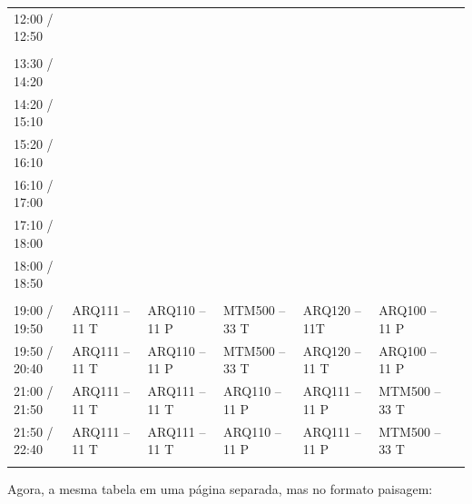 \documentclass[
	12pt,				%
	openright,			%
	oneside,			%
	a4paper,			%
	english,			%
	brazil				%
	]{abntex2}
\begin{document}
\begin{table}[]
{\begin{tabular}{lllllll}
			12:00 / 12:50 &               &               &                         &                                      &               &  \\
			\multicolumn{7}{l}{\cellcolor[HTML]{D9D9D9}}                                                                                      \\
			13:30 / 14:20 &               &               &                         &                                      &               &  \\
			14:20 / 15:10 &               &               &                         &                                      &               &  \\
			15:20 / 16:10 &               &               &                         &                                      &               &  \\
			16:10 / 17:00 &               &               &                         &                                      &               &  \\
			17:10 / 18:00 &               &               & {\color[HTML]{FF0000} } &                                      &               &  \\
			18:00 / 18:50 &               &               & {\color[HTML]{FF0000} } &                                      &               &  \\
			\multicolumn{7}{l}{\cellcolor[HTML]{D9D9D9}}                                                                                      \\
			19:00 / 19:50 & ARQ111 – 11 T & ARQ110 – 11 P & MTM500 – 33 T           & {\color[HTML]{434343} ARQ120 – 11T}  & ARQ100 – 11 P &  \\
			19:50 / 20:40 & ARQ111 – 11 T & ARQ110 – 11 P & MTM500 – 33 T           & {\color[HTML]{434343} ARQ120 – 11 T} & ARQ100 – 11 P &  \\
			21:00 / 21:50 & ARQ111 – 11 T & ARQ111 – 11 T & ARQ110 – 11 P           & ARQ111 – 11 P                        & MTM500 – 33 T &  \\
			21:50 / 22:40 & ARQ111 – 11 T & ARQ111 – 11 T & ARQ110 – 11 P           & ARQ111 – 11 P                        & MTM500 – 33 T &  \\
			\multicolumn{7}{l}{\cellcolor[HTML]{D9D9D9}}                                                                                     
		\end{tabular}%
	}
\end{table}


Agora, a mesma tabela em uma página separada, mas no formato paisagem:
\end{document}
